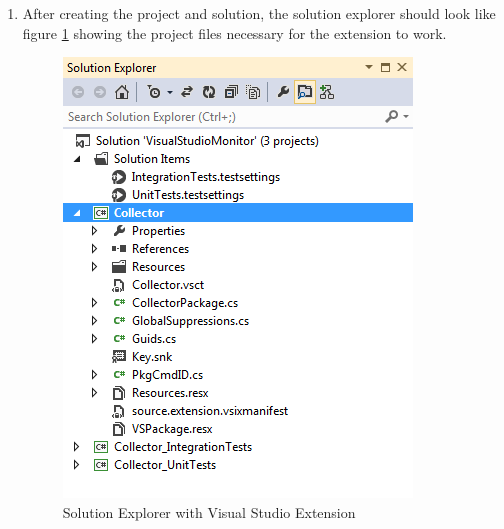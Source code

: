  \begin{Answer}

\begin{enumerate}
\item
After creating the project and solution, the solution explorer should look like figure \ref{fig:SolutionExplorer} showing the project files necessary for the extension to work.
\begin{figure}[h]
	\centering
	\includegraphics{Graphics/SolutionExplorer.png}
	\caption{Solution Explorer with Visual Studio Extension}
	\label{fig:SolutionExplorer}
\end{figure}
\end{enumerate}
\end{Answer}

